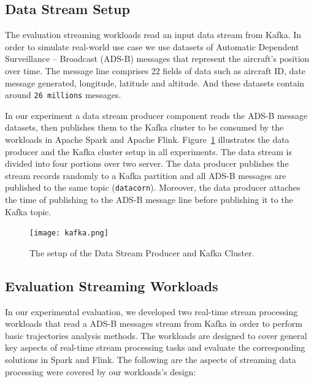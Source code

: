 \documentclass[]{article}
\begin{document}
\subsection{Data Stream Setup}
The evaluation streaming workloads read an input data stream from Kafka. In order to simulate real-world use case we use datasets of Automatic Dependent Surveillance – Broadcast (ADS-B) messages that represent the aircraft's position over time. The message line comprises 22 fields of data such as aircraft ID, date message generated, longitude, latitude and altitude.  And  these datasets contain around \texttt{26 millions} messages.  
\par In our experiment a data stream producer component reads the ADS-B message datasets, then publishes them to the Kafka cluster to be consumed by the workloads in Apache Spark and Apache Flink. Figure~\ref{fig:data_stream} illustrates the data producer and the Kafka cluster setup in all experiments.
The data stream is divided into four portions over two server. The data producer publishes the stream records randomly to a Kafka partition and all ADS-B messages are published to the same topic (\texttt{datacorn}). Moreover, the data producer attaches the time of publishing to the ADS-B message line before publishing it to the Kafka topic.

\begin{figure}[h]
 
  \centering
    \texttt{[image: kafka.png]}
     \caption{The setup of the Data Stream Producer and Kafka Cluster.}
     \label{fig:data_stream}
\end{figure} 

\newpage
\subsection{Evaluation Streaming Workloads}
In our experimental evaluation, we developed two real-time stream processing workloads that read a ADS-B messages stream from Kafka in order to perform basic trajectories analysis methods. The workloads are designed to cover general key aspects of real-time stream processing tasks and evaluate the corresponding solutions in Spark and Flink. The following are the aspects of streaming data processing were covered by our workloads's design: 
\end{document}
